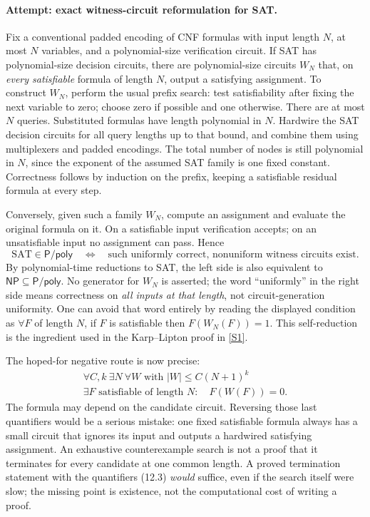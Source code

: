 \documentclass[11pt,a4paper]{article}
\newcommand{\sref}[2]{\hyperlink{source:#1:#2}{[S#2]}}
\begin{document}
\paragraph{Attempt: exact witness-circuit reformulation for SAT.}
Fix a conventional padded encoding of CNF formulas with input length
$N$, at most $N$ variables, and a polynomial-size verification circuit.
If SAT has polynomial-size decision circuits, there are polynomial-size
circuits $W_N$ that, on \emph{every satisfiable} formula of length $N$,
output a satisfying assignment. To construct $W_N$, perform the usual
prefix search: test satisfiability after fixing the next variable to
zero; choose zero if possible and one otherwise. There are at most $N$
queries. Substituted formulas have length polynomial in $N$. Hardwire
the SAT decision circuits for all query lengths up to that bound, and
combine them using multiplexers and padded encodings. The total number
of nodes is still polynomial in $N$, since the exponent of the assumed
SAT family is one fixed constant. Correctness follows by induction on
the prefix, keeping a satisfiable residual formula at every step.

Conversely, given such a family $W_N$, compute an assignment and evaluate
the original formula on it. On a satisfiable input verification accepts;
on an unsatisfiable input no assignment can pass. Hence
\[
 \mathrm{SAT}\in\mathsf{P/poly}
 \quad\Longleftrightarrow\quad
 \text{such uniformly correct, nonuniform witness circuits exist.}
 \tag{12.2}
\]
By polynomial-time reductions to SAT, the left side is also equivalent
to $\mathsf{NP}\subseteq\mathsf{P/poly}$. No generator for $W_N$ is
asserted; the word ``uniformly'' in the right side means correctness on
\emph{all inputs at that length}, not circuit-generation uniformity.
One can avoid that word entirely by reading the displayed condition as
$\forall F$ of length $N$, if $F$ is satisfiable then $F(W_N(F))=1$.
This self-reduction is the ingredient used in the Karp--Lipton proof in
\sref{30006678}{1}.

The hoped-for negative route is now precise:
\[
 \begin{gathered}
 \forall C,k\ \exists N\ \forall W\text{ with }|W|\leq C(N+1)^k\\
 \exists F\text{ satisfiable of length }N:\quad F(W(F))=0.
 \end{gathered} \tag{12.3}
\]
The formula may depend on the candidate circuit. Reversing those last
quantifiers would be a serious mistake: one fixed satisfiable formula
always has a small circuit that ignores its input and outputs a
hardwired satisfying assignment. An exhaustive counterexample search
is not a proof that it terminates for every candidate at one common
length. A proved termination statement with the quantifiers (12.3)
\emph{would} suffice, even if the search itself were slow; the missing
point is existence, not the computational cost of writing a proof.
\end{document}
